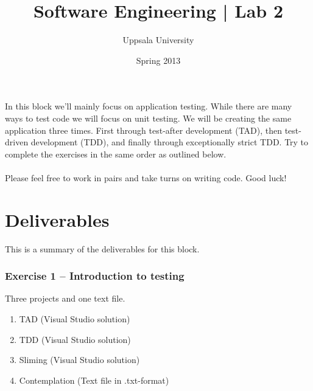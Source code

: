 \documentclass{article}
\begin{document}
  \title{ Software Engineering | Lab 2 }
  \author{ Uppsala University }
  \date{ Spring 2013 }
  \maketitle


    \paragraph{}
      In this block we'll mainly focus on application testing. While there are many ways to test code we will focus on unit testing. We will be creating the same application three times. First through test-after development (TAD), then test-driven development (TDD), and finally through exceptionally strict TDD. Try to complete the exercises in the same order as outlined below.
    \paragraph{}
      Please feel free to work in pairs and take turns on writing code. Good luck!



\pagebreak{}
\section*{Deliverables}
This is a summary of the deliverables for this block.

\subsubsection*{Exercise 1 -- Introduction to testing}
Three projects and one text file.
\begin{enumerate}
  \item TAD (Visual Studio solution)
  \item TDD (Visual Studio solution)
  \item Sliming (Visual Studio solution)
  \item Contemplation (Text file in .txt-format)
\end{enumerate}
\end{document}

